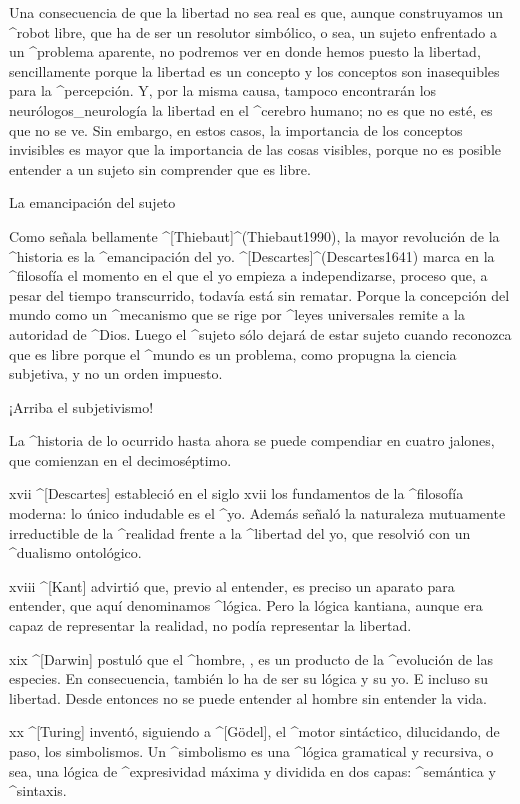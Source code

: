 Una consecuencia de que la libertad no sea real es que, aunque
construyamos un ^{robot} libre, que ha de ser un resolutor simbólico, o
sea, un sujeto enfrentado a un ^{problema aparente}, no podremos ver en
donde hemos puesto la libertad, sencillamente porque la libertad es un
concepto y los conceptos son inasequibles para la ^{percepción}. Y, por
la misma causa, tampoco encontrarán los neurólogos_{neurología} la
libertad en el ^{cerebro} humano; no es que no esté, es que no se ve.
Sin embargo, en estos casos, la importancia de los conceptos invisibles
es mayor que la importancia de las cosas visibles, porque no es posible
entender a un sujeto sin comprender que es libre.


\Section La emancipación del sujeto

Como señala bellamente ^[Thiebaut]^(Thiebaut1990), la mayor revolución
de la ^{historia} es la ^{emancipación} del yo.
^[Descartes]^(Descartes1641) marca en la ^{filosofía} el momento en el
que el yo empieza a independizarse, proceso que, a pesar del tiempo
transcurrido, todavía está sin rematar. Porque la concepción del mundo
como un ^{mecanismo} que se rige por ^{leyes universales} remite a la
autoridad de ^{Dios}. Luego el ^{sujeto} sólo dejará de estar sujeto
cuando reconozca que es libre porque el ^{mundo} es un problema, como
propugna la ciencia subjetiva, y no un orden impuesto.


\Section ¡Arriba el subjetivismo!

La ^{historia} de lo ocurrido hasta ahora se puede compendiar en cuatro
jalones, que comienzan en el decimoséptimo.

\siglo xvii ^[Descartes] estableció en el siglo {\sc xvii} los
fundamentos de la ^{filosofía} moderna: lo único indudable es el ^{yo}.
Además señaló la naturaleza mutuamente irreductible de la ^{realidad}
frente a la ^{libertad} del yo, que resolvió con un ^{dualismo}
ontológico.

\siglo xviii ^[Kant] advirtió que, previo al entender, es preciso un
aparato para entender, que aquí denominamos ^{lógica}. Pero la lógica
kantiana, aunque era capaz de representar la realidad, no podía
representar la libertad.

\siglo xix ^[Darwin] postuló que el ^{hombre}, , es un
producto de la ^{evolución} de las especies. En consecuencia, también lo
ha de ser su lógica y su yo. E incluso su libertad. Desde entonces no se
puede entender al hombre sin entender la vida.

\siglo xx ^[Turing] inventó, siguiendo a ^[Gödel], el ^{motor sintáctico},
dilucidando, de paso, los simbolismos. Un ^{simbolismo} es una ^{lógica
gramatical} y recursiva, o sea, una lógica de ^{expresividad} máxima y
dividida en dos capas: ^{semántica} y ^{sintaxis}.

